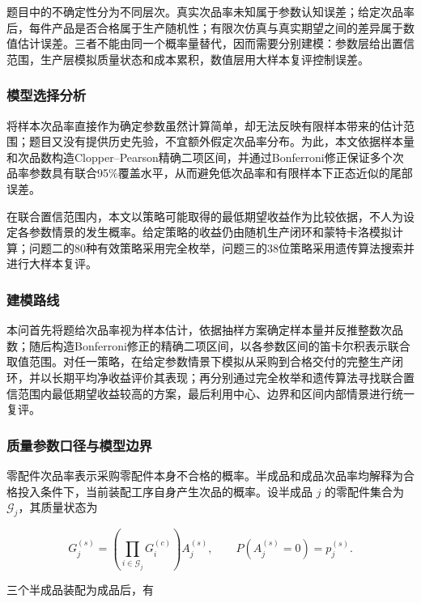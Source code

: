 \documentclass{cumcm}
\numberwithin{figure}{section}
\numberwithin{table}{section}
\begin{document}
题目中的不确定性分为不同层次。真实次品率未知属于参数认知误差；给定次品率后，每件产品是否合格属于生产随机性；有限次仿真与真实期望之间的差异属于数值估计误差。三者不能由同一个概率量替代，因而需要分别建模：参数层给出置信范围，生产层模拟质量状态和成本累积，数值层用大样本复评控制误差。

\subsubsection{模型选择分析}\label{ux6a21ux578bux9009ux62e9ux5206ux6790}

将样本次品率直接作为确定参数虽然计算简单，却无法反映有限样本带来的估计范围；题目又没有提供历史先验，不宜额外假定次品率分布。为此，本文依据样本量和次品数构造Clopper--Pearson精确二项区间，并通过Bonferroni修正保证多个次品率参数具有联合95\%覆盖水平，从而避免低次品率和有限样本下正态近似的尾部误差。

在联合置信范围内，本文以策略可能取得的最低期望收益作为比较依据，不人为设定各参数情景的发生概率。给定策略的收益仍由随机生产闭环和蒙特卡洛模拟计算；问题二的80种有效策略采用完全枚举，问题三的38位策略采用遗传算法搜索并进行大样本复评。

\subsubsection{建模路线}\label{ux5efaux6a21ux8defux7ebf}

本问首先将题给次品率视为样本估计，依据抽样方案确定样本量并反推整数次品数；随后构造Bonferroni修正的精确二项区间，以各参数区间的笛卡尔积表示联合取值范围。对任一策略，在给定参数情景下模拟从采购到合格交付的完整生产闭环，并以长期平均净收益评价其表现；再分别通过完全枚举和遗传算法寻找联合置信范围内最低期望收益较高的方案，最后利用中心、边界和区间内部情景进行统一复评。

\subsubsection{质量参数口径与模型边界}\label{ux8d28ux91cfux53c2ux6570ux53e3ux5f84ux4e0eux6a21ux578bux8fb9ux754c}

零配件次品率表示采购零配件本身不合格的概率。半成品和成品次品率均解释为合格投入条件下，当前装配工序自身产生次品的概率。设半成品 \(j\) 的零配件集合为 \(\mathcal G_j\)，其质量状态为

\[
G_j^{(s)}=
\left(\prod_{i\in\mathcal G_j}G_i^{(c)}\right)A_j^{(s)},
\qquad
P\left(A_j^{(s)}=0\right)=p_j^{(s)}.
\]

三个半成品装配为成品后，有
\end{document}
